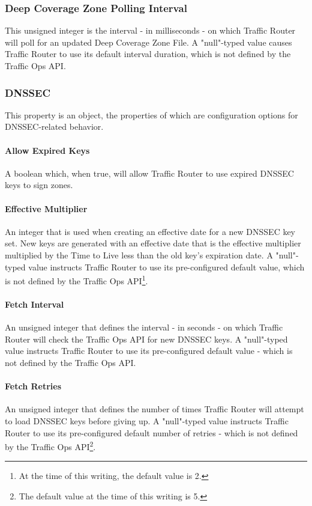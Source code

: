 \subsubsection{Deep Coverage Zone Polling Interval}
This unsigned integer is the interval - in milliseconds - on which Traffic
Router will poll for an updated Deep Coverage Zone File. A "null"-typed value
causes Traffic Router to use its default interval duration, which is not defined
by the Traffic Ops API.

\subsubsection{DNSSEC}
This property is an object, the properties of which are configuration options
for DNSSEC-related behavior.

\paragraph{Allow Expired Keys}
A boolean which, when true, will allow Traffic Router to use expired DNSSEC keys
to sign zones.

\paragraph{Effective Multiplier}
An integer that is used when creating an effective date for a new DNSSEC key
set. New keys are generated with an effective date that is the effective
multiplier multiplied by the Time to Live less than the old key's expiration
date. A "null"-typed value instructs Traffic Router to use its pre-configured
default value, which is not defined by the Traffic Ops API\footnote{At the time
of this writing, the default value is 2.}.

\paragraph{Fetch Interval}
An unsigned integer that defines the interval - in seconds - on which Traffic
Router will check the Traffic Ops API for new DNSSEC keys. A "null"-typed value
instructs Traffic Router to use its pre-configured default value - which is not
defined by the Traffic Ops API.

\paragraph{Fetch Retries}
An unsigned integer that defines the number of times Traffic Router will attempt
to load DNSSEC keys before giving up. A "null"-typed value instructs Traffic
Router to use its pre-configured default number of retries - which is not
defined by the Traffic Ops API\footnote{The default value at the time of this
writing is 5.}.

